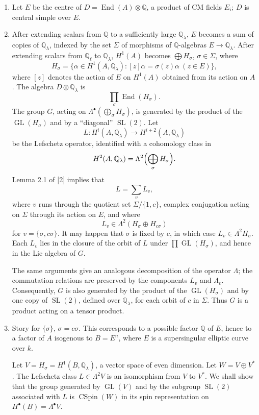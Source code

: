 \documentclass[11pt]{article}
\newcommand{\Q}{\mathbb Q}
\newcommand{\End}{\operatorname{End}}
\newcommand{\GL}{\operatorname{GL}}
\newcommand{\SL}{\operatorname{SL}}
\newcommand{\CSpin}{\operatorname{CSpin}}
\theoremstyle{deligne}
\begin{document}
\begin{enumerate}[label=(\alph*)]
\item Let $E$ be the centre of $D=\End(A)\otimes\Q$, a product of CM fields $E_i$; $D$ is central simple over $E$.
\item After extending scalars from $\Q$ to a sufficiently large $\Q_\lambda$, $E$ becomes a sum of copies of $\Q_\lambda$, indexed by the set $\Sigma$ of morphisms of $\Q$-algebras $E\to\Q_\lambda$. After extending scalars from $\Q_\ell$ to $\Q_\lambda$, $H^1(A)$ becomes $\bigoplus H_\sigma$, $\sigma\in\Sigma$, where
\[
H_\sigma=\{\alpha\in H^1(A,\Q_\lambda):[z]\alpha=\sigma(z)\alpha\ (z\in E)\},
\]
where $[z]$ denotes the action of $E$ on $H^1(A)$ obtained from its action on $A$. The algebra $D\otimes\Q_\lambda$ is
\[
\prod_\sigma \End(H_\sigma).
\]
The group $G$, acting on $\Lambda^\bullet(\bigoplus_\sigma H_\sigma)$, is generated by the product of the $\GL(H_\sigma)$ and by a ``diagonal'' $\SL(2)$. Let
\[
L:H^i(A,\Q_\lambda)\longrightarrow H^{i+2}(A,\Q_\lambda)
\]
be the Lefschetz operator, identified with a cohomology class in
\[
H^2(A,\Q_\lambda)=\Lambda^2\Bigl(\bigoplus_\sigma H_\sigma\Bigr).
\]
Lemma 2.1 of [2] implies that
\[
L=\sum_v L_v,
\]
where $v$ runs through the quotient set $\Sigma/\{1,c\}$, complex conjugation acting on $\Sigma$ through its action on $E$, and where
\[
L_v\in\Lambda^2(H_\sigma\oplus H_{c\sigma})
\]
for $v=\{\sigma,c\sigma\}$. It may happen that $\sigma$ is fixed by $c$, in which case $L_v\in\Lambda^2H_\sigma$. Each $L_v$ lies in the closure of the orbit of $L$ under $\prod\GL(H_\sigma)$, and hence in the Lie algebra of $G$.

The same arguments give an analogous decomposition of the operator $\Lambda$; the commutation relations are preserved by the components $L_v$ and $\Lambda_v$. Consequently, $G$ is also generated by the product of the $\GL(H_\sigma)$ and by one copy of $\SL(2)$, defined over $\Q_\lambda$, for each orbit of $c$ in $\Sigma$. Thus $G$ is a product acting on a tensor product.

\item Story for $\{\sigma\}$, $\sigma=c\sigma$. This corresponds to a possible factor $\Q$ of $E$, hence to a factor of $A$ isogenous to $B=E^n$, where $E$ is a supersingular elliptic curve over $k$.

Let $V=H_\sigma=H^1(B,\Q_\lambda)$, a vector space of even dimension. Let $W=V\oplus V^*$. The Lefschetz class $L\in\Lambda^2V$ is an isomorphism from $V$ to $V^*$. We shall show that the group generated by $\GL(V)$ and by the subgroup $\SL(2)$ associated with $L$ is $\CSpin(W)$ in its spin representation on $H^\bullet(B)=\Lambda^\bullet V$.


\end{enumerate}
\end{document}
